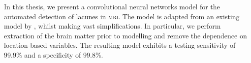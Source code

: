 In this thesis, we present a convolutional neural networks model for the automated detection of lacunes in \textsc{mri}. The model is adapted from an existing model by \cite{GhafoorianM.2017Dml3}, whilst making vast simplifications. In particular, we perform extraction of the brain matter prior to modelling and remove the dependence on location-based variables. The resulting model exhibits a testing sensitivity of 99.9\% and a specificity of 99.8\%.

